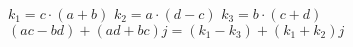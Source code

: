 $k_1 = c\cdot(a+b)$
$k_2 = a\cdot(d-c)$
$k_3 = b\cdot(c+d)$
$(ac-bd) + (ad+bc)j = (k_1-k_3) + (k_1+k_2)j$
